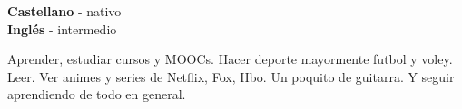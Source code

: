 \begin{minipage}[t]{0.3\textwidth}
	\vspace{-\baselineskip} %

	
	\textbf{Castellano} - nativo\\
	\textbf{Inglés} - intermedio
\end{minipage}
\begin{minipage}[t]{0.7\textwidth}
	\vspace{-\baselineskip} %
	

	Aprender, estudiar cursos y MOOCs. Hacer deporte mayormente futbol y voley. Leer. Ver animes y series de Netflix, Fox, Hbo. Un poquito de guitarra. Y seguir aprendiendo de todo en general.
\end{minipage}
	
	
